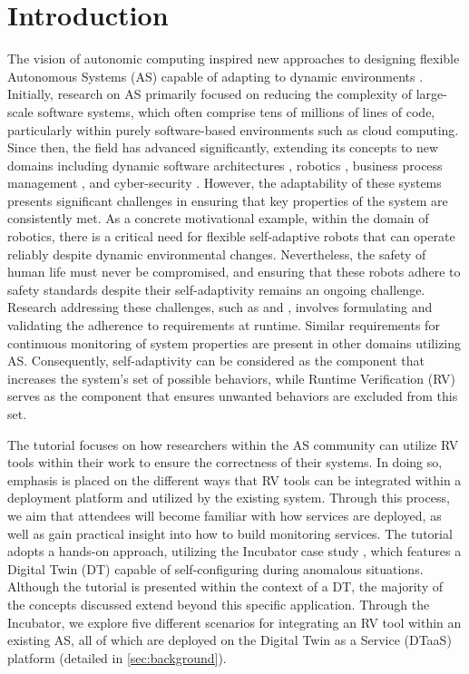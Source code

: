 \section{Introduction}

The vision of autonomic computing inspired new approaches to designing flexible Autonomous Systems (AS) capable of adapting to dynamic environments \cite{kephartVisionAutonomicComputing2003}.
Initially, research on AS primarily focused on reducing the complexity of large-scale software systems, which often comprise tens of millions of lines of code, particularly within purely software-based environments such as cloud computing.
Since then, the field has advanced significantly, extending its concepts to new domains including dynamic software architectures \cite{Albassam:2017:DARE}, robotics \cite{Cheng:2020:ACROS}, business process management \cite{malburgApplyingMAPEKControl2023}, and cyber-security \cite{Papamartzivanos:2019:ItrusionDetection}.
However, the adaptability of these systems presents significant challenges in ensuring that key properties of the system are consistently met.
As a concrete motivational example, within the domain of robotics, there is a critical need for flexible self-adaptive robots that can operate reliably despite dynamic environmental changes.
Nevertheless, the safety of human life must never be compromised, and ensuring that these robots adhere to safety standards despite their self-adaptivity remains an ongoing challenge.
Research addressing these challenges, such as \cite{Cheng:2020:ACROS} and \cite{jahanMAPEKMAPESACInteraction2020a}, involves formulating and validating the adherence to requirements at runtime.
Similar requirements for continuous monitoring of system properties are present in other domains utilizing AS.
Consequently, self-adaptivity can be considered as the component that increases the system's set of possible behaviors, while Runtime Verification (RV) serves as the component that ensures unwanted behaviors are excluded from this set.

The tutorial focuses on how researchers within the AS community can utilize RV tools within their work to ensure the correctness of their systems.
In doing so, emphasis is placed on the different ways that RV tools can be integrated within a deployment platform and utilized by the existing system.
Through this process, we aim that attendees will become familiar with how services are deployed, as well as gain practical insight into how to build monitoring services.
The tutorial adopts a hands-on approach, utilizing the Incubator case study \cite{Feng2021, Feng2022}, which features a Digital Twin (DT) capable of self-configuring during anomalous situations.
Although the tutorial is presented within the context of a DT, the majority of the concepts discussed extend beyond this specific application.
Through the Incubator, we explore five different scenarios for integrating an RV tool within an existing AS, all of which are deployed on the Digital Twin as a Service (DTaaS) platform (detailed in \cref{sec:background}).

